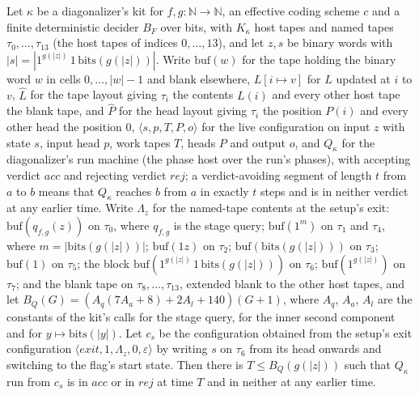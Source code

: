 \begin{theorem}
\label{Turing.NTimeDiag.dz_hQ}
\leanok
{}
Let $\kappa$ be a diagonalizer's kit for $f, g : \mathbb{N} \to \mathbb{N}$, an effective coding scheme $c$ and a finite deterministic decider $B_F$ over bits, with $K_\kappa$ host tapes and named tapes $\tau_0, \dots, \tau_{13}$ (the host tapes of indices $0, \dots, 13$), and let $z, s$ be binary words with $|s| = |1^{g(|z|)}\,1\,\mathrm{bits}(g(|z|))|$. Write $\mathrm{buf}(w)$ for the tape holding the binary word $w$ in cells $0, \dots, |w| - 1$ and blank elsewhere, $L[i \mapsto v]$ for $L$ updated at $i$ to $v$, $\hat L$ for the tape layout giving $\tau_i$ the contents $L(i)$ and every other host tape the blank tape, and $\hat P$ for the head layout giving $\tau_i$ the position $P(i)$ and every other head the position $0$, $\langle s, p, T, P, o\rangle$ for the live configuration on input $z$ with state $s$, input head $p$, work tapes $T$, heads $P$ and output $o$, and $Q_\kappa$ for the diagonalizer's run machine (the phase host over the run's phases), with accepting verdict $\mathit{acc}$ and rejecting verdict $\mathit{rej}$; a verdict-avoiding segment of length $t$ from $a$ to $b$ means that $Q_\kappa$ reaches $b$ from $a$ in exactly $t$ steps and is in neither verdict at any earlier time. Write $\Lambda_z$ for the named-tape contents at the setup's exit: $\mathrm{buf}(q_{f,g}(z))$ on $\tau_0$, where $q_{f,g}$ is the stage query; $\mathrm{buf}(1^m)$ on $\tau_1$ and $\tau_4$, where $m = |\mathrm{bits}(g(|z|))|$; $\mathrm{buf}(1z)$ on $\tau_2$; $\mathrm{buf}(\mathrm{bits}(g(|z|)))$ on $\tau_3$; $\mathrm{buf}(1)$ on $\tau_5$; the block $\mathrm{buf}(1^{g(|z|)}\,1\,\mathrm{bits}(g(|z|)))$ on $\tau_6$; $\mathrm{buf}(1^{g(|z|)})$ on $\tau_7$; and the blank tape on $\tau_8, \dots, \tau_{13}$, extended blank to the other host tapes, and let $B_Q(G) = (A_q(7A_a + 8) + 2A_l + 140)(G + 1)$, where $A_q$, $A_a$, $A_l$ are the constants of the kit's calls for the stage query, for the inner second component and for $y \mapsto \mathrm{bits}(|y|)$. Let $c_s$ be the configuration obtained from the setup's exit configuration $\langle \mathit{exit}, 1, \Lambda_z, 0, \varepsilon\rangle$ by writing $s$ on $\tau_6$ from its head onwards and switching to the flag's start state. Then there is $T \le B_Q(g(|z|))$ such that $Q_\kappa$ run from $c_s$ is in $\mathit{acc}$ or in $\mathit{rej}$ at time $T$ and in neither at any earlier time.
\end{theorem}

